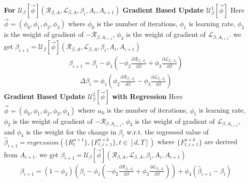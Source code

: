 \hspace{2mm} \newline \textbf{For $\mathcal{U_{\beta}}[\vec{\phi}](\mathcal{R}_{\beta, A},\mathcal{L}_{\beta, A},\beta_i,A_i, A_{i+1})$}
\newline \textbf{Gradient Based Update $\mathcal{U}^{1}_{\beta}[\vec{\phi}]$}
\newline Here $\vec{\phi} = (\phi_0,\phi_1,\phi_2,\phi_3)$ where $\phi_0$ is the number of iterations, $\phi_1$ is learning rate, $\phi_2$ is the weight of gradient of $-\mathcal{R}_{\beta, A_{i+1}}$,  $\phi_3$ is the weight of gradient of $\mathcal{L}_{\beta, A_{i+1}}$.
\newline we get $\beta_{i+1} = \mathcal{U}_{\beta}[\vec{\phi}](\mathcal{R}_{\beta, A},\mathcal{L}_{\beta, A},\beta_i,A_i, A_{i+1})$
\begin{equation}
\begin{aligned}
    \beta_{i+1} = \beta_{i} -\phi_1( -\phi_2 \frac{\partial \mathcal{R}_{\beta_i, A_{i}}}{\partial \beta} + \phi_3 \frac{\partial \mathcal{L}_{\beta_i, A_{i}}}{\partial \beta} )
\end{aligned}
\end{equation}
\begin{equation}
\begin{aligned}
    \Delta \beta_{i} =  \phi_1(\phi_2 \frac{\partial \mathcal{R}_{\beta_i, A_{i}}}{\partial \beta} - \phi_3 \frac{\partial \mathcal{L}_{\beta_i, A_{i}}}{\partial \beta} )
\end{aligned}
\end{equation}
\newline \textbf{Gradient Based Update $\mathcal{U}^{2}_{\beta}[\vec{\phi}]$ with Regression}
\newline Here $\vec{\phi} = (\phi_0,\phi_1,\phi_2,\phi_3,\phi_4)$ where $\alpha_0$ is the number of iterations, $\phi_1$ is learning rate, $\phi_2$ is the weight of gradient of $-\mathcal{R}_{\beta, A_{i+1}}$,  $\phi_3$ is the weight of gradient of $\mathcal{L}_{\beta, A_{i+1}}$, and $\phi_4$ is the weight for the change in $\beta_i$ w.r.t. the regressed value of $\hat{\beta}_{i+1} = regression(\{R^{n\times 1}_{t}\},\{F^{n\times k}_{t, {i+1}}\}, t\in [d,T])$ where $\{F^{n\times k}_{t, {i+1}}\}$ are derived from $A_{i+1}$. 
\newline we get $\beta_{i+1} = \mathcal{U}_{\beta}[\vec{\phi}](\mathcal{R}_{\beta, A},\mathcal{L}_{\beta, A},\beta_i,A_i, A_{i+1})$
\begin{equation}
\begin{aligned}
    \beta_{i+1} = (1-\phi_4)(\beta_{i} -\phi_1( -\phi_2 \frac{\partial \mathcal{R}_{\beta_i, A_{i}}}{\partial \beta} + \phi_3 \frac{\partial \mathcal{L}_{\beta_i, A_{i}}}{\partial \beta} )) + \phi_4(\hat{\beta}_{i+1}-\beta_{i})
\end{aligned}
\end{equation}

